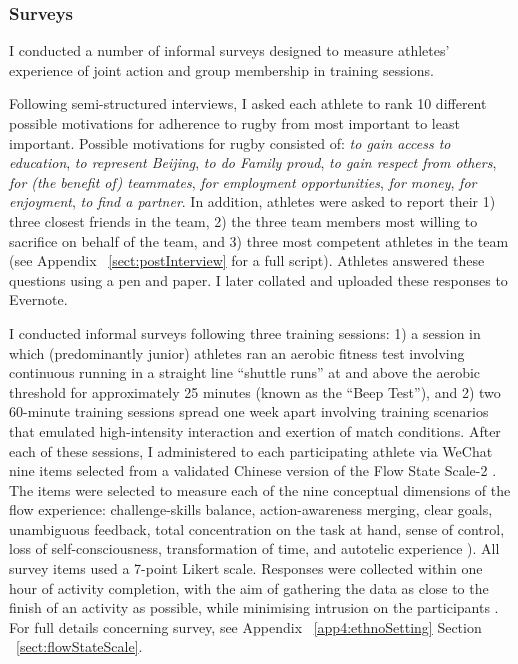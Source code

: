 \begin{CJK}{UTF8}{gbsn}

\subsubsection{Surveys}

 I conducted a number of informal surveys designed to measure athletes' experience of joint action and group membership in training sessions.

   Following semi-structured interviews, I asked each athlete to rank 10 different possible motivations for adherence to rugby from most important to least important. Possible motivations for rugby consisted of: \textit{to gain access to education}, \textit{to represent Beijing}, \textit{to do Family proud}, \textit{to gain respect from others}, \textit{for (the benefit of) teammates}, \textit{for employment opportunities}, \textit{for money}, \textit{for enjoyment}, \textit{to find a partner}. In addition, athletes were asked to report their 1) three closest friends in the team, 2) the three team members most willing to sacrifice on behalf of the team, and 3) three most competent athletes in the team (see Appendix ~\ref{sect:postInterview} for a full script). Athletes answered these questions using a pen and paper. I later collated and uploaded these responses to Evernote.

    I conducted informal surveys following three training sessions: 1) a session in which (predominantly junior) athletes ran an aerobic fitness test involving continuous running in a straight line ``shuttle runs''  at and above the aerobic threshold for approximately 25 minutes (known as the ``Beep Test''), and 2) two 60-minute training sessions spread one week apart involving training scenarios that emulated high-intensity interaction and exertion of match conditions.  After each of these sessions, I administered to each participating athlete via WeChat nine items selected from a validated Chinese version \citep{Liu2012} of the Flow State Scale-2 \citep{Jackson2002}.  The items were selected to measure each of the nine conceptual dimensions of the flow experience: challenge-skills balance, action-awareness merging, clear goals, unambiguous feedback, total concentration on the task at hand, sense of control, loss of self-consciousness, transformation of time, and autotelic experience \citep{Csikszentmihalyi1990}).  All survey items used a 7-point Likert scale.  Responses were collected within one hour of activity completion, with the aim of gathering the data as close to the finish of an activity as possible, while minimising intrusion on the participants \citep{Jackson2004}. For full details concerning survey, see Appendix ~\ref{app4:ethnoSetting} Section ~\ref{sect:flowStateScale}.



\end{CJK}

